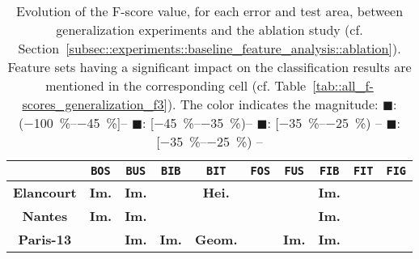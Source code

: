         \begin{table}[htbp]
            \footnotesize 
            \centering
            \renewcommand{\arraystretch}{2}
            \begin{tabular}{| c | c c c c |c c c c c|}
                \hline
                & \texttt{BOS} & \texttt{BUS} & \texttt{BIB} & \texttt{BIT} & \texttt{FOS} & \texttt{FUS} & \texttt{FIB} & \texttt{FIT} & \texttt{FIG} \\
                \hline
                \textbf{Elancourt} & \cellcolor{LOSS3545} \textbf{Im.} & \cellcolor{LOSS3545} \textbf{Im.} & \cellcolor{LOSS2535} & \cellcolor{LOSS1525} \textbf{Hei.} & \cellcolor{STBL} & \cellcolor{GAIN45} & \cellcolor{GAIN2535} \textbf{Im.} & \cellcolor{LOSS1525} & \cellcolor{GAIN0515} \\
                \textbf{Nantes} & \cellcolor{STBL} \textbf{Im.} & \cellcolor{LOSS1525} \textbf{Im.} &  & \cellcolor{GAIN1525} & \cellcolor{STBL} & \cellcolor{STBL} & \cellcolor{LOSS0515} \textbf{Im.} & & \cellcolor{STBL} \\
                \textbf{Paris-13} & \cellcolor{LOSS0515} & \cellcolor{STBL} \textbf{Im.} & \cellcolor{GAIN1525} \textbf{Im.} & \cellcolor{GAIN0515} \textbf{Geom.} & \cellcolor{STBL} & \cellcolor{LOSS45} \textbf{Im.} & \cellcolor{STBL} \textbf{Im.} & \cellcolor{GAIN0515} & \cellcolor{LOSS0515} \\
                \hline
            \end{tabular}
            \renewcommand{\arraystretch}{1}
            \caption[
                Evolution of the F-score value, for each error and test area, between generalization experiments and the ablation study.
            ]{
                \label{tab::generalization_comparison}
                Evolution of the F-score value, for each error and test area, between generalization experiments and the ablation study (cf. Section~\ref{subsec::experiments::baseline_feature_analysis::ablation}).
                Feature sets having a significant impact on the classification results are mentioned in the corresponding cell (cf. Table~\ref{tab::all_f-scores_generalization_f3}).
                The color indicates the magnitude:
                \textcolor{LOSS45}{\(\blacksquare\)}: (\SIrange[range-phrase={,  }]{-100}{-45}{\percent}]--
                \textcolor{LOSS3545}{\(\blacksquare\)}: [\SIrange[range-phrase={,  }]{-45}{-35}{\percent})--
                \textcolor{LOSS2535}{\(\blacksquare\)}: [\SIrange[range-phrase={, }]{-35}{-25}{\percent}) --
                \textcolor{LOSS1525}{\(\blacksquare\)}: [\SIrange[range-phrase={, }]{-35}{-25}{\percent}) --
}
\end{table}
